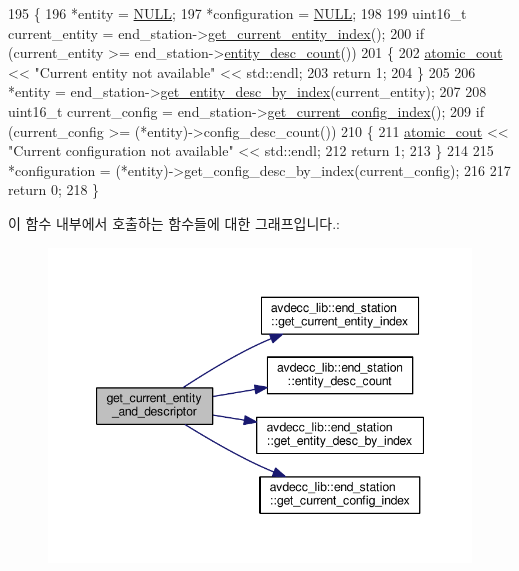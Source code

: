 \begin{DoxyCode}
195 \{
196     *entity = \hyperlink{openavb__types__base__pub_8h_a070d2ce7b6bb7e5c05602aa8c308d0c4}{NULL};
197     *configuration = \hyperlink{openavb__types__base__pub_8h_a070d2ce7b6bb7e5c05602aa8c308d0c4}{NULL};
198 
199     uint16\_t current\_entity = end\_station->\hyperlink{classavdecc__lib_1_1end__station_aaf7e2defcfdf88c62c04fd88bd49787d}{get\_current\_entity\_index}();
200     \textcolor{keywordflow}{if} (current\_entity >= end\_station->\hyperlink{classavdecc__lib_1_1end__station_a14c0322d46a8800dbb4908716db50d86}{entity\_desc\_count}())
201     \{
202         \hyperlink{cmd__line_8h_a0bc38ccc65c79ba06c6fcd7b4bf554c3}{atomic\_cout} << \textcolor{stringliteral}{"Current entity not available"} << std::endl;
203         \textcolor{keywordflow}{return} 1;
204     \}
205 
206     *entity = end\_station->\hyperlink{classavdecc__lib_1_1end__station_a7456434346294f611e4d37255be4051b}{get\_entity\_desc\_by\_index}(current\_entity);
207 
208     uint16\_t current\_config = end\_station->\hyperlink{classavdecc__lib_1_1end__station_abaf546b5bb641dcf161f895e3d6d8cd8}{get\_current\_config\_index}();
209     \textcolor{keywordflow}{if} (current\_config >= (*entity)->config\_desc\_count())
210     \{
211         \hyperlink{cmd__line_8h_a0bc38ccc65c79ba06c6fcd7b4bf554c3}{atomic\_cout} << \textcolor{stringliteral}{"Current configuration not available"} << std::endl;
212         \textcolor{keywordflow}{return} 1;
213     \}
214 
215     *configuration = (*entity)->get\_config\_desc\_by\_index(current\_config);
216 
217     \textcolor{keywordflow}{return} 0;
218 \}
\end{DoxyCode}


이 함수 내부에서 호출하는 함수들에 대한 그래프입니다.\+:
\nopagebreak
\begin{figure}[H]
\begin{center}
\leavevmode
\includegraphics[width=347pt]{classcmd__line_aa22ed7f036749918eb875043f10060c9_cgraph}
\end{center}
\end{figure}




